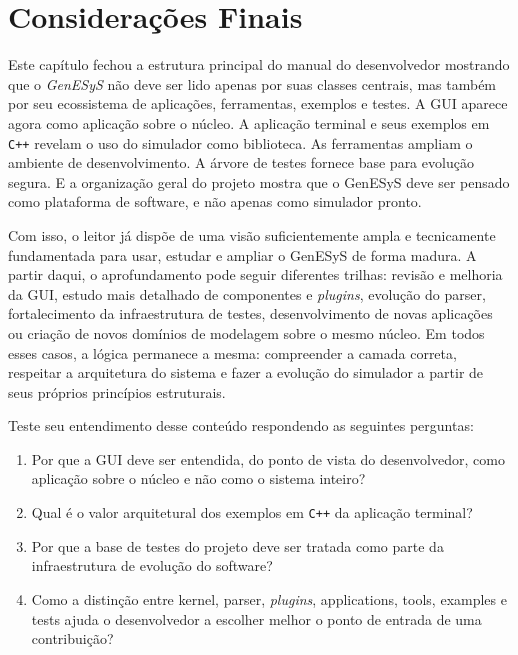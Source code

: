 \section{Considerações Finais}
\label{sec:cap10_consideracoes_finais}

Este capítulo fechou a estrutura principal do manual do desenvolvedor mostrando que o \textit{GenESyS} não deve ser lido apenas por suas classes centrais, mas também por seu ecossistema de aplicações, ferramentas, exemplos e testes. A GUI aparece agora como aplicação sobre o núcleo. A aplicação terminal e seus exemplos em \texttt{C++} revelam o uso do simulador como biblioteca. As ferramentas ampliam o ambiente de desenvolvimento. A árvore de testes fornece base para evolução segura. E a organização geral do projeto mostra que o GenESyS deve ser pensado como plataforma de software, e não apenas como simulador pronto.

Com isso, o leitor já dispõe de uma visão suficientemente ampla e tecnicamente fundamentada para usar, estudar e ampliar o GenESyS de forma madura. A partir daqui, o aprofundamento pode seguir diferentes trilhas: revisão e melhoria da GUI, estudo mais detalhado de componentes e \textit{plugins}, evolução do parser, fortalecimento da infraestrutura de testes, desenvolvimento de novas aplicações ou criação de novos domínios de modelagem sobre o mesmo núcleo. Em todos esses casos, a lógica permanece a mesma: compreender a camada correta, respeitar a arquitetura do sistema e fazer a evolução do simulador a partir de seus próprios princípios estruturais.

Teste seu entendimento desse conteúdo respondendo as seguintes perguntas:

\begin{enumerate}
    \item Por que a GUI deve ser entendida, do ponto de vista do desenvolvedor, como aplicação sobre o núcleo e não como o sistema inteiro?

    \item Qual é o valor arquitetural dos exemplos em \texttt{C++} da aplicação terminal?

    \item Por que a base de testes do projeto deve ser tratada como parte da infraestrutura de evolução do software?

    \item Como a distinção entre kernel, parser, \textit{plugins}, applications, tools, examples e tests ajuda o desenvolvedor a escolher melhor o ponto de entrada de uma contribuição?
\end{enumerate}